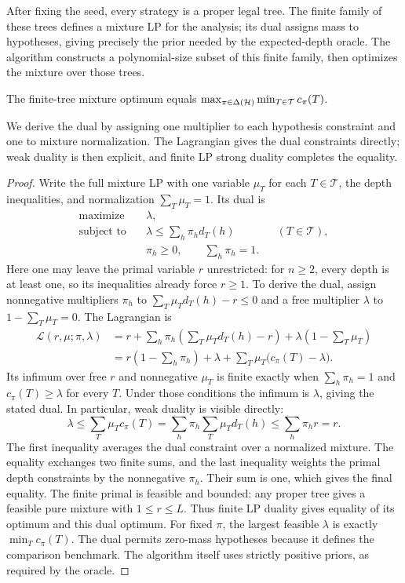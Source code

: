After fixing the seed, every strategy is a proper legal tree. The
finite family of these trees defines a mixture LP for the analysis;
its dual assigns mass to hypotheses, giving precisely the prior needed
by the expected-depth oracle. The algorithm constructs a polynomial-size
subset of this finite family, then optimizes the mixture over those trees.
\begin{claim}
\label{clm:randomized-finite-dual}
The finite-tree mixture optimum equals
$\max_{\pi\in\Delta(\mathcal H)}\min_{T\in\mathcal T}c_\pi(T)$.
\end{claim}
\begin{proofstrategy}
We derive the dual by assigning one multiplier to each hypothesis
constraint and one to mixture normalization. The Lagrangian gives the
dual constraints directly; weak duality is then explicit, and finite
LP strong duality completes the equality.
\end{proofstrategy}
\begin{proof}
Write the full mixture LP with one variable $\mu_T$ for each
$T\in\mathcal T$, the depth inequalities, and normalization
$\sum_T\mu_T=1$. Its dual is
\[
 \begin{aligned}
  \text{maximize}\quad&\lambda,\\
  \text{subject to}\quad&
       \lambda\le\sum_h\pi_hd_T(h) &&(T\in\mathcal T),\\
   &\pi_h\ge0,\qquad\sum_h\pi_h=1.
 \end{aligned}
\]
Here one may leave the primal variable $r$ unrestricted: for
$n\ge2$, every depth is at least one, so its inequalities already
force $r\ge1$. To derive the dual, assign nonnegative multipliers
$\pi_h$ to $\sum_T\mu_Td_T(h)-r\le0$ and a free multiplier
$\lambda$ to $1-\sum_T\mu_T=0$. The Lagrangian is
\[
\begin{aligned}
 \mathcal L(r,\mu;\pi,\lambda)
 &=r+\sum_h\pi_h\left(\sum_T\mu_Td_T(h)-r\right)
                      +\lambda\left(1-\sum_T\mu_T\right)\\
 &=r\left(1-\sum_h\pi_h\right)+\lambda
                  +\sum_T\mu_T\bigl(c_\pi(T)-\lambda\bigr).
\end{aligned}
\]
Its infimum over free $r$ and nonnegative $\mu_T$ is finite exactly
when $\sum_h\pi_h=1$ and $c_\pi(T)\ge\lambda$ for every $T$.
Under those conditions the infimum is $\lambda$, giving the stated
dual. In particular, weak duality is visible directly:
\[
 \lambda\le\sum_T\mu_Tc_\pi(T)
       =\sum_h\pi_h\sum_T\mu_Td_T(h)
       \le\sum_h\pi_hr=r.
\]
The first inequality averages the dual constraint over a normalized
mixture. The equality exchanges two finite sums, and the last
inequality weights the primal depth constraints by the nonnegative
$\pi_h$. Their sum is one, which gives the final equality.
The finite primal is feasible and bounded: any proper tree gives
a feasible pure mixture with $1\le r\le L$. Thus
finite LP duality gives equality of its optimum and this dual
optimum. For fixed $\pi$, the largest feasible $\lambda$ is exactly
$\min_Tc_\pi(T)$. The dual permits zero-mass hypotheses because it
defines the comparison benchmark. The algorithm itself uses strictly
positive priors, as required by the oracle.
\end{proof}


